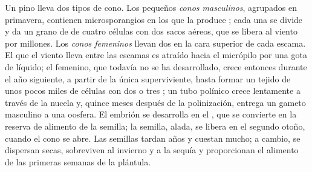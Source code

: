 \begin{proposition}\label{prop:b2:plant-life-cycles:conifer}
Un pino lleva dos tipos de cono. Los pequeños \emph{conos masculinos},
agrupados en primavera, contienen microsporangios en los que la 
produce ; cada una se divide y da un grano de  de cuatro
células con dos sacos aéreos, que se libera al viento por millones. Los
\emph{conos femeninos} llevan dos  en la cara superior de cada
escama. El  que el viento lleva entre las escamas es atraído hacia
el micrópilo por una gota de líquido; el  femenino, que todavía
no se ha desarrollado, crece entonces durante el año siguiente, a partir
de la única  superviviente, hasta formar un tejido de unos pocos
miles de células con dos o tres ; un tubo polínico crece
lentamente a través de la nucela y, quince meses después de la
polinización, entrega un gameto masculino a una oosfera. El embrión se
desarrolla en el , que se convierte en la reserva de alimento
de la semilla; la semilla, alada, se libera en el segundo otoño, cuando
el cono se abre. Las semillas tardan años y cuestan mucho; a cambio, se
dispersan secas, sobreviven al invierno y a la sequía y proporcionan el
alimento de las primeras semanas de la plántula.
\end{proposition}

